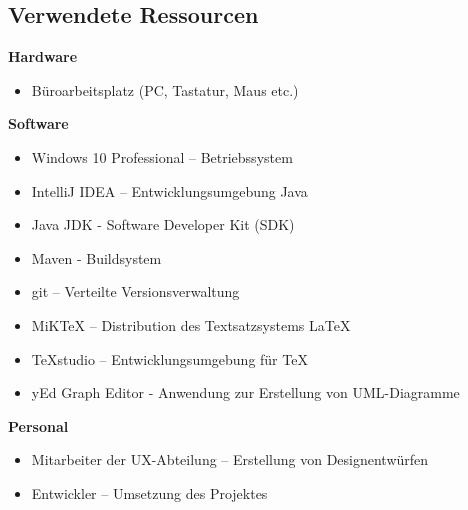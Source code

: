 \subsection{Verwendete Ressourcen}
\label{ressources}

\textbf{Hardware}

\begin{itemize}
\item Büroarbeitsplatz (PC, Tastatur, Maus etc.)
\end{itemize}
 
\textbf{Software}

\begin{itemize}
\item Windows 10 Professional – Betriebssystem
\item IntelliJ IDEA – Entwicklungsumgebung Java
\item Java JDK - Software Developer Kit (SDK)
\item Maven - Buildsystem
\item git – Verteilte Versionsverwaltung
\item MiKTeX – Distribution des Textsatzsystems \LaTeX
\item TeXstudio – Entwicklungsumgebung für \TeX
\item yEd Graph Editor - Anwendung zur Erstellung von UML-Diagramme
\end{itemize}

\textbf{Personal}

\begin{itemize}
\item Mitarbeiter der UX-Abteilung – Erstellung von Designentwürfen
\item Entwickler – Umsetzung des Projektes
\end{itemize}